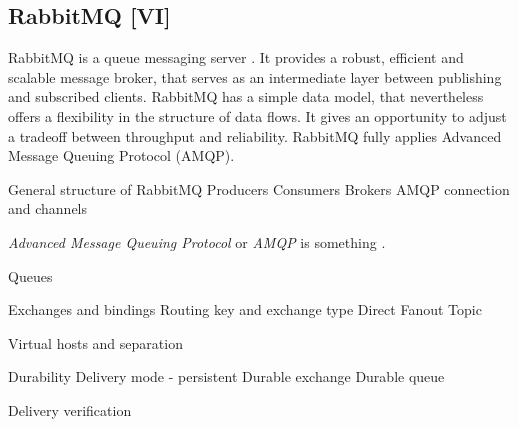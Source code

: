 \subsection{RabbitMQ [VI]}

RabbitMQ is a queue messaging server \cite{RabbitMQ, AlvaroWilliams2012}.
It provides a robust, efficient and scalable message broker, that serves as an intermediate layer between publishing and subscribed clients.
RabbitMQ has a simple data model, that nevertheless offers a flexibility in the structure of data flows.
It gives an opportunity to adjust a tradeoff between throughput and reliability.
RabbitMQ fully applies Advanced Message Queuing Protocol (AMQP).

General structure of RabbitMQ
Producers
Consumers
Brokers
AMQP connection and channels

\textit{Advanced Message Queuing Protocol}  or \textit{AMQP} is something \cite{AMQP2011}.

Queues

Exchanges and bindings
Routing key and exchange type
Direct
Fanout
Topic

Virtual hosts and separation

Durability
Delivery mode - persistent
Durable exchange
Durable queue

Delivery verification